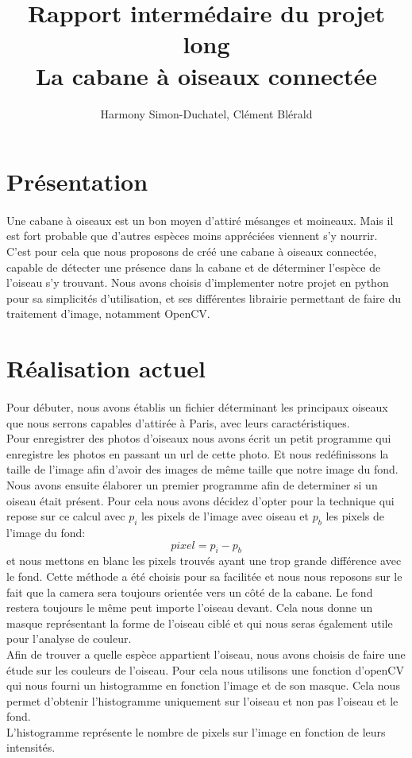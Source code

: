 \documentclass{article}
\title{Rapport intermédaire du projet long \\ La cabane à oiseaux connectée }
\author{Harmony Simon-Duchatel, Clément Blérald}
\begin{document}
\maketitle


\section{Présentation}
\paragraph {}
Une cabane à oiseaux est un bon moyen d'attiré mésanges et moineaux. Mais il est fort probable que d'autres espèces moins appréciées viennent s'y nourrir. \\
C'est pour cela que nous proposons de créé une cabane à oiseaux connectée, capable de détecter une présence dans la cabane et de déterminer l'espèce de l'oiseau s'y trouvant. 
Nous avons choisis d'implementer notre projet en python pour sa simplicités d'utilisation, et ses différentes librairie permettant de faire du traitement d'image, notamment OpenCV.
\section{Réalisation actuel} 
\paragraph {}
Pour débuter, nous avons établis un fichier déterminant les principaux oiseaux que nous serrons capables d'attirée à Paris, avec leurs caractéristiques. \\
Pour enregistrer des photos d'oiseaux nous avons écrit un petit programme qui enregistre les photos en passant un url de cette photo. Et nous redéfinissons la taille de l'image
afin d'avoir des images de même taille que notre image du fond.\\
Nous avons ensuite élaborer un premier programme afin de determiner si un oiseau était présent.
Pour cela nous avons décidez d'opter pour la technique qui repose sur ce calcul  avec $p_{i}$ les pixels de l'image avec oiseau et $p_{b}$ les pixels de l'image du fond: 
$$
pixel = p_{i} - p_{b}
$$
et nous mettons en blanc les pixels trouvés ayant une trop grande différence avec le fond. Cette méthode a été choisis pour sa facilitée et nous nous reposons sur le fait que la camera sera toujours orientée vers un côté de la cabane. Le fond restera toujours le même peut importe l'oiseau devant. Cela nous donne un masque représentant la forme de l'oiseau ciblé et qui nous seras également utile pour l'analyse de couleur.\\
Afin de trouver a quelle espèce appartient l'oiseau, nous avons choisis de faire une étude sur les couleurs de l'oiseau. Pour cela nous utilisons une fonction d'openCV qui nous fourni un histogramme en fonction l'image et de son masque. Cela nous permet d'obtenir l'histogramme uniquement sur l'oiseau et non pas l'oiseau et le fond. \\
L'histogramme représente le nombre de pixels sur l'image en fonction de leurs intensités.\\
\end{document}
